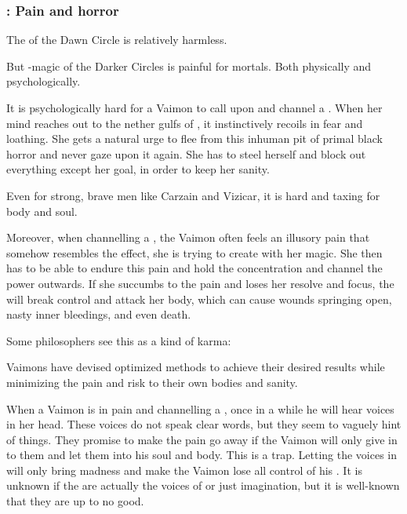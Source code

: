 \subsubsection{\Itzach: Pain and horror}
The \qliphoth{} of the Dawn Circle is relatively harmless. 

But \qliphah-magic of the Darker Circles is painful for mortals. 
Both physically and psychologically. 

It is psychologically hard for a Vaimon to call upon and channel a \qliphah{}. 
When her mind reaches out to the nether gulfs of \Itzach, it instinctively recoils in fear and loathing. 
She gets a natural urge to flee from this inhuman pit of primal black horror and never gaze upon it again. 
She has to steel herself and block out everything except her goal, in order to keep her sanity. 

Even for strong, brave men like Carzain and Vizicar, it is hard and taxing for body and soul. 

Moreover, when channelling a \qliphah, the Vaimon often feels an illusory pain that somehow resembles the effect, she is trying to create with her magic.   
She then has to be able to endure this pain and hold the concentration and channel the power outwards. 
If she succumbs to the pain and loses her resolve and focus, the \qliphah{} will break control and attack her body, which can cause wounds springing open, nasty inner bleedings, and even death. 

Some philosophers see this as a kind of karma: 

\Itzach{} Vaimons have devised optimized methods to achieve their desired results while minimizing the pain and risk to their own bodies and sanity. 

When a Vaimon is in pain and channelling a \qliphah, once in a while he will hear voices in her head. 
These voices do not speak clear words, but they seem to vaguely hint of things. 
They promise to make the pain go away if the Vaimon will only give in to them and let them into his soul and body. 
This is a trap. 
Letting the voices in will only bring madness and make the Vaimon lose all control of his \qliphoth. 
It is unknown if the  are actually the voices of \qliphoth{} or just imagination, but it is well-known that they are up to no good. 





